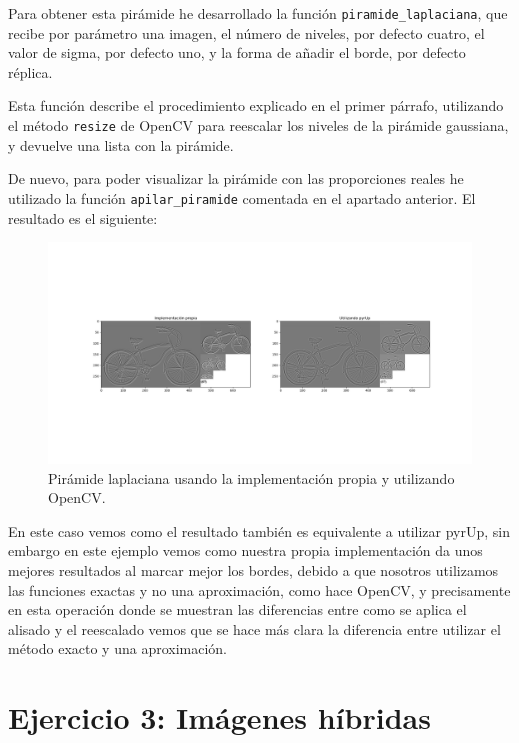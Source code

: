 \documentclass[12pt, spanish]{article}
\begin{document}
Para obtener esta pirámide he desarrollado la función \texttt{piramide\_laplaciana}, que recibe por parámetro una imagen, el número de niveles, por defecto cuatro, el valor de sigma, por defecto uno, y la forma de añadir el borde, por defecto réplica.

Esta función describe el procedimiento explicado en el primer párrafo, utilizando el método \texttt{resize} de OpenCV para reescalar los niveles de la pirámide gaussiana, y devuelve una lista con la pirámide.

De nuevo, para poder visualizar la pirámide con las proporciones reales he utilizado la función \texttt{apilar\_piramide} comentada en el apartado anterior. El resultado es el siguiente:

\begin{figure}[H]
  \centering
      \includegraphics[width=\textwidth]{ej2AL.png}
 		 \caption{Pirámide laplaciana usando la implementación propia y utilizando OpenCV.}
  		\label{fig:ej2al}

\end{figure}

En este caso vemos como el resultado también es equivalente a utilizar pyrUp, sin embargo en este ejemplo vemos como nuestra propia implementación da unos mejores resultados al marcar mejor los bordes, debido a que nosotros utilizamos las funciones exactas y no una aproximación, como hace OpenCV, y precisamente en esta operación donde se muestran las diferencias entre como se aplica el alisado y el reescalado vemos que se hace más clara la diferencia entre utilizar el método exacto y una aproximación.

\section{Ejercicio 3: Imágenes híbridas}
\end{document}
